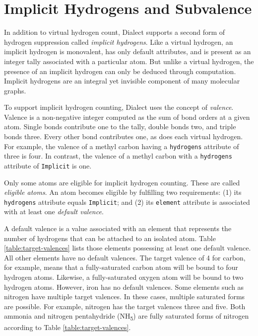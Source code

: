 \documentclass{article}
\def\ttt{\texttt}
\begin{document}
\section*{Implicit Hydrogens and Subvalence}

In addition to virtual hydrogen count, Dialect supports a second form of hydrogen suppression called \textit{implicit hydrogens}. Like a virtual hydrogen, an implicit hydrogen is monovalent, has only default attributes, and is present as an integer tally associated with a particular atom. But unlike a virtual hydrogen, the presence of an implicit hydrogen can only be deduced through computation. Implicit hydrogens are an integral yet invisible component of many molecular graphs.

To support implicit hydrogen counting, Dialect uses the concept of \textit{valence}. Valence is a non-negative integer computed as the sum of bond orders at a given atom. Single bonds contribute one to the tally, double bonds two, and triple bonds three. Every other bond contributes one, as does each virtual hydrogen. For example, the valence of a methyl carbon having a \ttt{hydrogens} attribute of three is four. In contrast, the valence of a methyl carbon with a \ttt{hydrogens} attribute of \ttt{Implicit} is one.

Only some atoms are eligible for implicit hydrogen counting. These are called \textit{eligible atoms}. An atom becomes eligible by fulfilling two requirements: (1) its \ttt{hydrogens} attribute equals \ttt{Implicit}; and (2) its \ttt{element} attribute is associated with at least one \textit{default valence}.

A default valence is a value associated with an element that represents the number of hydrogens that can be attached to an isolated atom. Table \ref{table:target-valences} lists those elements possessing at least one default valence. All other elements have no default valences. The target valence of 4 for carbon, for example, means that a fully-saturated carbon atom will be bound to four hydrogen atoms. Likewise, a fully-saturated oxygen atom will be bound to two hydrogen atoms. However, iron has no default valences. Some elements such as nitrogen have multiple target valences. In these cases, multiple saturated forms are possible. For example, nitrogen has the target valences three and five. Both ammonia and nitrogen pentahydride (NH\textsubscript{5}) are fully saturated forms of nitrogen according to Table \ref{table:target-valences}.
\end{document}
